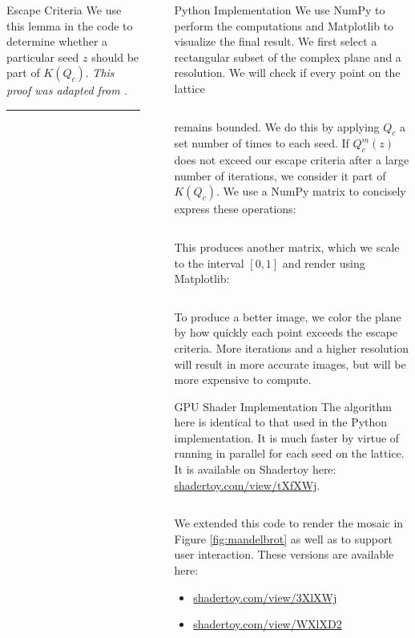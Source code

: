 \documentclass[final]{beamer}
\newlength{\sepwidth}
\newlength{\colwidth}
\newcommand{\separatorcolumn}{\begin{column}{\sepwidth}\end{column}}
\begin{document}
\begin{frame}[t]
\begin{columns}[t]
\begin{column}{\colwidth}
\begin{alertblock}{Escape Criteria}
		We use this lemma in the code to determine whether a particular
		seed $z$ should be part of $K(Q_c)$. \hfill \textit{\small This proof was adapted from \cite{ecsource}.}
	\end{alertblock}
	\hrule
	\nocite{*}
	\footnotesize{}
\end{column}

\separatorcolumn

\begin{column}{\colwidth}

	\begin{block}{Python Implementation}
		We use NumPy to perform the computations and Matplotlib
		to visualize the final result.
		We first select a rectangular subset of the complex plane
		and a resolution. We will check if every point on the lattice
		\inputminted[firstline=102,lastline=103]{python}{../visualize.py}
		remains bounded.
		We do this by applying $Q_c$ a set number of times to each seed.
		If $Q^{m}_c(z)$ does not exceed our escape criteria after a large number
    of iterations, we consider it part of $K(Q_c)$.
		We use a NumPy matrix to concisely express these operations:
		\inputminted[firstline=108,lastline=113]{python}{../visualize.py}
		This produces another matrix, which we scale to the interval
		$[0, 1]$ and render using Matplotlib:
		\inputminted[firstline=118,lastline=118]{python}{../visualize.py}
		To produce a better image, we color the plane
		by how quickly each point exceeds the escape criteria.
		More iterations and a higher resolution
		will result in more accurate images, but will be more expensive to compute.
	\end{block}

	\begin{block}{GPU Shader Implementation}
		The algorithm here is identical to that used in the Python
		implementation.
		It is much faster by virtue of running in parallel for each seed
		on the lattice.
		It is available on Shadertoy here: \href{https://www.shadertoy.com/view/tXfXWj}{shadertoy.com/view/tXfXWj}.
		\inputminted[firstline=271,lastline=278]{glsl}{../render.glsl}

		We extended this code to render the mosaic in Figure \ref{fig:mandelbrot}
		as well as to support user interaction.
		These versions are available here:
		\begin{multicols}{2}
			\begin{itemize}
				\item \href{https://www.shadertoy.com/view/3XlXWj}{shadertoy.com/view/3XlXWj} \item \href{https://www.shadertoy.com/view/WXlXD2}{shadertoy.com/view/WXlXD2}
			\end{itemize}
		\end{multicols}
	\end{block}
\end{column}


\end{columns}
\end{frame}
\end{document}
